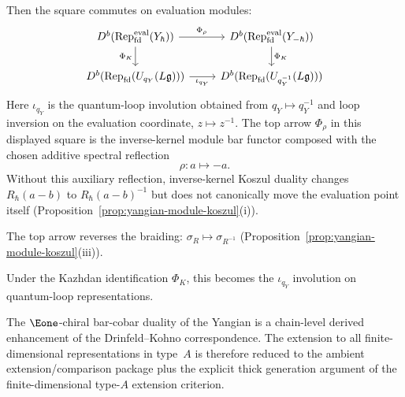 \begin{theorem}
Then the square commutes on evaluation modules:
\begin{equation}\label{eq:dk-square-yangian}
\begin{tikzcd}
D^b(\operatorname{Rep}_{\mathrm{fd}}^{\mathrm{eval}}(Y_\hbar))
 \ar[r, "\Phi_\rho"]
 \ar[d, "\Phi_K"']
& D^b(\operatorname{Rep}_{\mathrm{fd}}^{\mathrm{eval}}(Y_{-\hbar}))
 \ar[d, "\Phi_K"]
\\
D^b(\operatorname{Rep}_{\mathrm{fd}}(U_{q_Y}(L\mathfrak{g})))
 \ar[r, "\iota_{q_Y}"']
& D^b(\operatorname{Rep}_{\mathrm{fd}}(U_{q_Y^{-1}}(L\mathfrak{g})))
\end{tikzcd}
\end{equation}
Here $\iota_{q_Y}$ is the quantum-loop involution obtained from
$q_Y\mapsto q_Y^{-1}$ and loop inversion on the evaluation coordinate,
$z\mapsto z^{-1}$.
The top arrow $\Phi_\rho$ in this displayed square is the
inverse-kernel module
bar functor composed with the chosen additive spectral reflection
\[
\rho\colon a\longmapsto -a.
\]
Without this auxiliary reflection, inverse-kernel Koszul duality
changes $R_\hbar(a-b)$ to $R_\hbar(a-b)^{-1}$ but does not
canonically move the evaluation point itself
\textup{(}Proposition~\textup{\ref{prop:yangian-module-koszul}(i)}\textup{)}.

The top arrow reverses the braiding:
$\sigma_R \mapsto \sigma_{R^{-1}}$
\textup{(}Proposition~\ref{prop:yangian-module-koszul}\textup{(iii)}\textup{)}.

Under the Kazhdan identification $\Phi_K$, this becomes the
$\iota_{q_Y}$ involution on quantum-loop representations.

The $\Eone$-chiral bar-cobar duality of the Yangian
is a chain-level derived enhancement of the Drinfeld--Kohno
correspondence. The extension to all finite-dimensional
representations in type~$A$ is therefore reduced to the ambient
extension/comparison package plus the explicit thick generation
argument of the finite-dimensional type-$A$ extension criterion.
\end{theorem}

